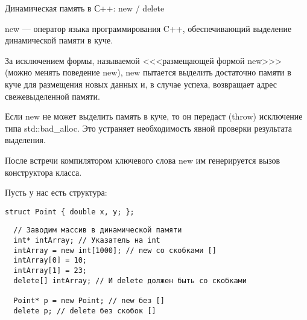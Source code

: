 \begin{frame}[t,fragile]{Динамическая память в С++: new / delete}

new --- оператор языка программирования C++, 
обеспечивающий выделение динамической памяти в куче. 

За исключением формы, называемой <<<размещающей формой new>>>
(можно менять поведение new), 
new пытается выделить достаточно памяти в куче для размещения новых данных и, 
в случае успеха, возвращает адрес свежевыделенной памяти. 

Если new не может выделить память в куче, то он передаст (throw) 
исключение типа std::bad\_alloc. 
Это устраняет необходимость явной проверки результата выделения. 

После встречи компилятором ключевого слова new им генерируется вызов конструктора класса.

Пусть у нас есть структура:
\begin{lstlisting}  
struct Point { double x, y; };
\end{lstlisting}  

\begin{lstlisting}  
  // Заводим массив в динамической памяти
  int* intArray; // Указатель на int
  intArray = new int[1000]; // new со скобками []
  intArray[0] = 10;
  intArray[1] = 23;
  delete[] intArray; // И delete должен быть со скобками

  Point* p = new Point; // new без []
  delete p; // delete без скобок []
\end{lstlisting}  

\end{frame}
